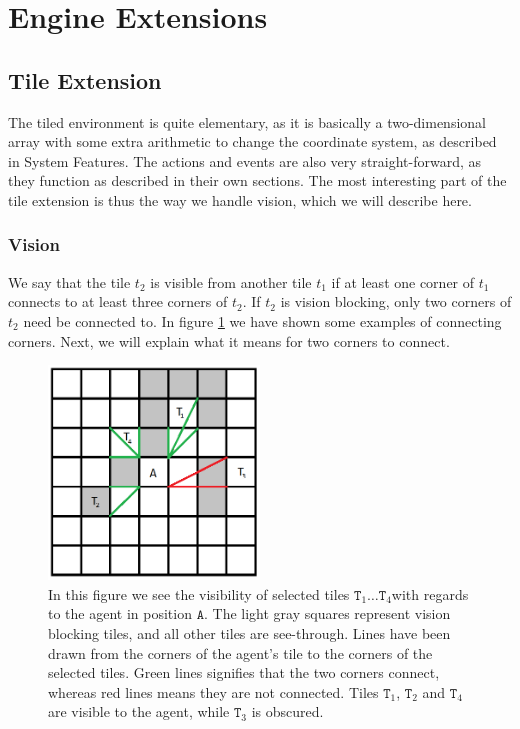 
\section{Engine Extensions}


\subsection{Tile Extension\label{sub:ImplementationTileExtension}}

The tiled environment is quite elementary, as it is basically a two-dimensional
array with some extra arithmetic to change the coordinate system,
as described in System Features. The actions and events are also very
straight-forward, as they function as described in their own sections.
The most interesting part of the tile extension is thus the way we
handle vision, which we will describe here.


\subsubsection*{Vision}

We say that the tile $t_{2}$ is visible from another tile $t_{1}$
if at least one corner of $t_{1}$ connects to at least three corners
of $t_{2}$. If $t_{2}$ is vision blocking, only two corners of $t_{2}$
need be connected to. In figure \ref{fig:TileMapVision} we have shown
some examples of connecting corners. Next, we will explain what it
means for two corners to connect.

\begin{figure}
\begin{centering}
\includegraphics[width=0.5\textwidth]{tilemapVision}
\par\end{centering}

\caption{In this figure we see the visibility of selected tiles $\mathtt{T}_{1}\dots\mathtt{T}_{4}$with
regards to the agent in position $\mathtt{A}$. The light gray squares
represent vision blocking tiles, and all other tiles are see-through.
Lines have been drawn from the corners of the agent's tile to the
corners of the selected tiles. Green lines signifies that the two
corners connect, whereas red lines means they are not connected. Tiles
$\mathtt{T}_{1}$, $\mathtt{T}_{2}$ and $\mathtt{T}_{4}$ are visible
to the agent, while $\mathtt{T}_{3}$ is obscured.\label{fig:TileMapVision}}


\end{figure}


